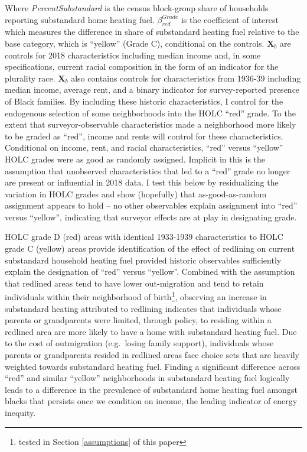 \documentclass[
]{article}
\begin{document}
Where \textit{PercentSubstandard} is the census block-group share of households reporting substandard home heating fuel. \(\beta_{red}^{Grade}\) is the coefficient of interest which measures the difference in share of substandard heating fuel relative to the base category, which is ``yellow'' (Grade C), conditional on the controls. \(\mathbf{X}_b\) are controls for 2018 characteristics including median income and, in some specifications, current racial composition in the form of an indicator for the plurality race. \(\mathbf{X}_b\) also contains controls for characteristics from 1936-39 including median income, average rent, and a binary indicator for survey-reported presence of Black families. By including these historic characteristics, I control for the endogenous selection of some neighborhoods into the HOLC ``red'' grade. To the extent that surveyor-observable characteristics made a neighborhood more likely to be graded as ``red'', income and rents will control for these characteristics. Conditional on income, rent, and racial characteristics, ``red'' versus ``yellow'' HOLC grades were as good as randomly assigned. Implicit in this is the assumption that unobserved characteristics that led to a ``red'' grade no longer are present or influential in 2018 data. I test this below by residualizing the variation in HOLC grades and show (hopefully) that as-good-as-random assignment appears to hold -- no other observables explain assignment into ``red'' versus ``yellow'', indicating that surveyor effects are at play in designating grade.

HOLC grade D (red) areas with identical 1933-1939 characteristics to HOLC grade C (yellow) areas provide identification of the effect of redlining on current substandard household heating fuel provided historic observables sufficiently explain the designation of ``red'' versus ``yellow''. Combined with the assumption that redlined areas tend to have lower out-migration and tend to retain individuals within their neighborhood of birth\footnote{tested in Section \ref{assumptions} of this paper}, observing an increase in substandard heating attributed to redlining indicates that individuals whose parents or grandparents were limited, through policy, to residing within a redlined area are more likely to have a home with substandard heating fuel. Due to the cost of outmigration (e.g.~losing family support), individuals whose parents or grandparents resided in redlined areas face choice sets that are heavily weighted towards substandard heating fuel. Finding a significant difference across ``red'' and similar ``yellow'' neighborhoods in substandard heating fuel logically leads to a difference in the prevalence of substandard home heating fuel amongst blacks that persists once we condition on income, the leading indicator of energy inequity.
\end{document}

